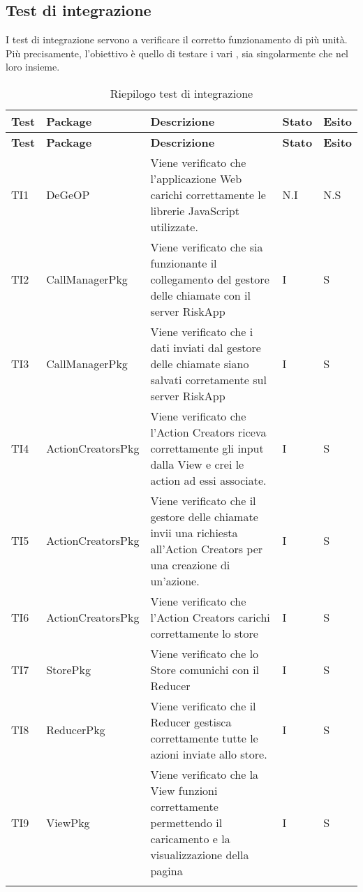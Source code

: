 	\subsection{Test di integrazione}
		I test di integrazione servono a verificare il corretto funzionamento di più unità. Più precisamente, l'obiettivo è quello di testare i vari , sia singolarmente che nel loro insieme.
\def\arraystretch{1.5}
\begin{longtable}{p{1cm}!{\VRule[1pt]}p{3cm}!{\VRule[1pt]}p{5cm}!{\VRule[1pt]}p{1.5cm}!{\VRule[1pt]}p{1.5cm}}
	\color{white} \textbf{Test} & \color{white} \textbf{Package} & \color{white} \textbf{Descrizione} & \color{white} \textbf{Stato} & \color{white} \textbf{Esito} \\ 
	\endfirsthead
	\color{white} \textbf{Test} & \color{white} \textbf{Package} & \color{white} \textbf{Descrizione} & \color{white} \textbf{Stato} & \color{white} \textbf{Esito} \\ 
	\endhead
	TI1 & DeGeOP & Viene verificato che l’applicazione Web carichi correttamente le librerie JavaScript utilizzate. & N.I & N.S\\
	TI2 & CallManagerPkg & Viene verificato che sia funzionante il collegamento del gestore delle chiamate con il server RiskApp & I & S\\
	TI3 & CallManagerPkg & Viene verificato che i dati inviati dal gestore delle chiamate siano salvati corretamente sul server RiskApp & I & S\\
	TI4 & ActionCreatorsPkg & Viene verificato che l’Action Creators riceva correttamente gli input dalla View e crei le action ad essi associate. & I & S\\
	TI5 & ActionCreatorsPkg & Viene verificato che il gestore delle chiamate invii una richiesta all'Action Creators per una creazione di un'azione. & I & S\\
	TI6 & ActionCreatorsPkg & Viene verificato che l'Action Creators carichi correttamente lo store & I & S\\
	TI7 & StorePkg & Viene verificato che lo Store comunichi con il Reducer & I & S\\
	TI8 & ReducerPkg & Viene verificato che il Reducer gestisca correttamente tutte le azioni inviate allo store. & I & S\\
	TI9 & ViewPkg & Viene verificato che la View funzioni correttamente permettendo il caricamento e la visualizzazione della pagina & I & S\\
	\caption{Riepilogo test di integrazione}
\end{longtable}

